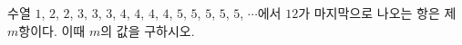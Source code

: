 \hspace*{2mm}\begin{minipage}[t]{\dimexpr\linewidth-2mm\relax}\vspace{0pt}
수열 $1$, $2$, $2$, $3$, $3$, $3$, $4$, $4$, $4$, $4$, $5$, $5$, $5$, $5$, $5$, $\cdots$에서 $12$가 마지막으로 나오는 항은 제$m$항이다. 이때 $m$의 값을 구하시오.\end{minipage}
